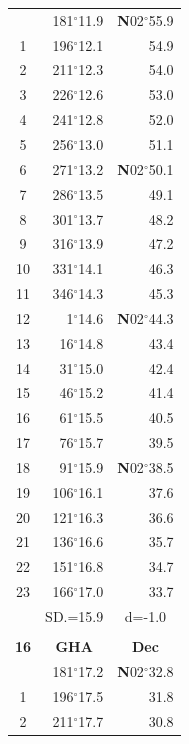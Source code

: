 \documentclass[10pt, a4paper]{report}
\begin{document}
\begin{scriptsize}
\begin{tabular*}{0.2\textwidth}[t]{@{\extracolsep{\fill}}|c|rr|}
\hline\rule{0pt}{2.6ex}\noindent
0 & 181$^\circ$11.9 & \textbf{N}02$^\circ$55.9\\
1 & 196$^\circ$12.1 & 54.9\\
2 & 211$^\circ$12.3 & 54.0\\
3 & 226$^\circ$12.6 & \raisebox{0.24ex}{\boldmath$\cdot$~\boldmath$\cdot$~~}53.0\\
4 & 241$^\circ$12.8 & 52.0\\
5 & 256$^\circ$13.0 & 51.1\\[2Pt]
6 & 271$^\circ$13.2 & \textbf{N}02$^\circ$50.1\\
7 & 286$^\circ$13.5 & 49.1\\
8 & 301$^\circ$13.7 & 48.2\\
9 & 316$^\circ$13.9 & \raisebox{0.24ex}{\boldmath$\cdot$~\boldmath$\cdot$~~}47.2\\
10 & 331$^\circ$14.1 & 46.3\\
11 & 346$^\circ$14.3 & 45.3\\[2Pt]
12 & 1$^\circ$14.6 & \textbf{N}02$^\circ$44.3\\
13 & 16$^\circ$14.8 & 43.4\\
14 & 31$^\circ$15.0 & 42.4\\
15 & 46$^\circ$15.2 & \raisebox{0.24ex}{\boldmath$\cdot$~\boldmath$\cdot$~~}41.4\\
16 & 61$^\circ$15.5 & 40.5\\
17 & 76$^\circ$15.7 & 39.5\\[2Pt]
18 & 91$^\circ$15.9 & \textbf{N}02$^\circ$38.5\\
19 & 106$^\circ$16.1 & 37.6\\
20 & 121$^\circ$16.3 & 36.6\\
21 & 136$^\circ$16.6 & \raisebox{0.24ex}{\boldmath$\cdot$~\boldmath$\cdot$~~}35.7\\
22 & 151$^\circ$16.8 & 34.7\\
23 & 166$^\circ$17.0 & 33.7\\
\hline
\rule{0pt}{2.4ex} & \multicolumn{1}{c}{SD.=15.9} & \multicolumn{1}{c|}{d=-1.0}\\
\hline
\multicolumn{1}{c}{}\\[-0.5ex]\hline
\multicolumn{1}{|c|}{\rule{0pt}{2.6ex}\textbf{16}} & \multicolumn{1}{c}{\textbf{GHA}} & \multicolumn{1}{c|}{\textbf{Dec}}\\
\hline\rule{0pt}{2.6ex}\noindent
0 & 181$^\circ$17.2 & \textbf{N}02$^\circ$32.8\\
1 & 196$^\circ$17.5 & 31.8\\
2 & 211$^\circ$17.7 & 30.8\\

\end{tabular*}
\end{scriptsize}
\end{document}
